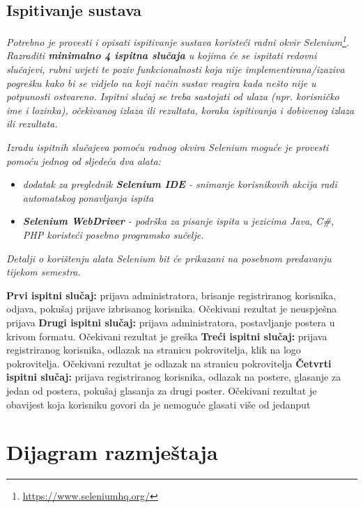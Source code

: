 			
			\subsection{Ispitivanje sustava}
			
			 \textit{Potrebno je provesti i opisati ispitivanje sustava koristeći radni okvir Selenium\footnote{\url{https://www.seleniumhq.org/}}. Razraditi \textbf{minimalno 4 ispitna slučaja} u kojima će se ispitati redovni slučajevi, rubni uvjeti te poziv funkcionalnosti koja nije implementirana/izaziva pogrešku kako bi se vidjelo na koji način sustav reagira kada nešto nije u potpunosti ostvareno. Ispitni slučaj se treba sastojati od ulaza (npr. korisničko ime i lozinka), očekivanog izlaza ili rezultata, koraka ispitivanja i dobivenog izlaza ili rezultata.\\ }
			 
			 \textit{Izradu ispitnih slučajeva pomoću radnog okvira Selenium moguće je provesti pomoću jednog od sljedeća dva alata:}
			 \begin{itemize}
			 	\item \textit{dodatak za preglednik \textbf{Selenium IDE} - snimanje korisnikovih akcija radi automatskog ponavljanja ispita	}
			 	\item \textit{\textbf{Selenium WebDriver} - podrška za pisanje ispita u jezicima Java, C\#, PHP koristeći posebno programsko sučelje.}
			 \end{itemize}
		 	\textit{Detalji o korištenju alata Selenium bit će prikazani na posebnom predavanju tijekom semestra.}
		 	
		 	\textbf{Prvi ispitni slučaj:} prijava administratora, brisanje registriranog korisnika, odjava, pokušaj prijave izbrisanog korisnika. Očekivani rezultat je neuspješna prijava
		 	\textbf{Drugi ispitni slučaj:} prijava administratora, postavljanje postera u krivom formatu. Očekivani rezultat je greška
		 	\textbf{Treći ispitni slučaj:} prijava registriranog korisnika, odlazak na stranicu pokrovitelja, klik na logo pokrovitelja. Očekivani rezultat je odlazak na stranicu pokrovitelja
		 	\textbf{Četvrti ispitni slučaj:} prijava registriranog korisnika, odlazak na postere, glasanje za jedan od postera, pokušaj glasanja za drugi poster. Očekivani rezultat je obavijest koja korisniku govori da je nemoguće glasati više od jedanput
			
			\eject 
		
		
		\section{Dijagram razmještaja}
			

